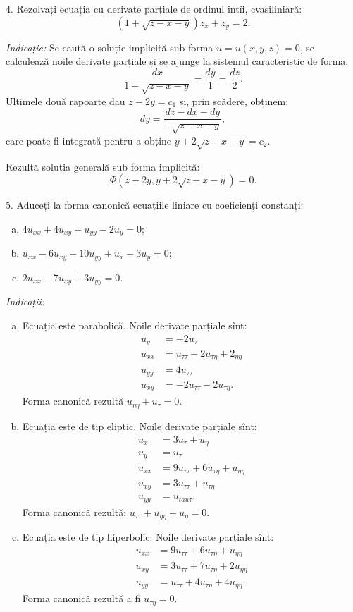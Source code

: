 \vspace{1cm}

4. Rezolvați ecuația cu derivate parțiale de ordinul întîi, cvasiliniară:
\[
  (1 + \sqrt{z - x - y})z_x + z_y = 2.
\]

\emph{Indicație:} Se caută o soluție implicită sub forma $ u = u(x, y, z) = 0 $, se calculează
noile derivate parțiale și se ajunge la sistemul caracteristic de forma:
\[
  \dfrac{dx}{1 + \sqrt{z - x - y}} = \dfrac{dy}{1} = \dfrac{dz}{2}.
\]
Ultimele două rapoarte dau $ z - 2y = c_1 $ și, prin scădere, obținem:
\[
  dy = \dfrac{dz - dx - dy}{-\sqrt{z - x - y}},
\]
care poate fi integrată pentru a obține $ y + 2 \sqrt{z - x - y} = c_2 $.

Rezultă soluția generală sub forma implicită:
\[
  \Phi(z - 2y, y + 2 \sqrt{z - x - y}) = 0.
\]

\vspace{1cm}

5. Aduceți la forma canonică ecuațiile liniare cu coeficienți constanți:
\begin{enumerate}[(a)]
\item $ 4u_{xx} + 4u_{xy} + u_{yy} - 2u_y = 0 $;
\item $ u_{xx} - 6u_{xy} + 10u_{yy} + u_x - 3u_y = 0 $;
\item $ 2u_{xx} - 7u_{xy} + 3u_{yy} = 0 $.
\end{enumerate}

\emph{Indicații:}
\begin{enumerate}[(a)]
\item Ecuația este parabolică. Noile derivate parțiale sînt:
  \begin{align*}
    u_y &= -2u_\tau \\
    u_{xx} &= u_{\tau\tau} + 2u_{\tau\eta} + 2_{\eta\eta} \\
    u_{yy} &= 4u_{\tau\tau} \\
    u_{xy} &= -2u_{\tau\tau} - 2u_{\tau\eta}.
  \end{align*}
  Forma canonică rezultă $ u_{\eta\eta} + u_\tau = 0 $.
\item Ecuația este de tip eliptic. Noile derivate parțiale sînt:
  \begin{align*}
    u_x &= 3u_\tau + u_\eta \\
    u_y &= u_\tau \\
    u_{xx} &= 9u_{\tau\tau} + 6u_{\tau\eta} + u_{\eta\eta} \\
    u_{xy} &= 3u_{\tau\tau} + u_{\tau\eta} \\
    u_{yy} &= u_{tau\tau}.
  \end{align*}
  Forma canonică rezultă: $ u_{\tau\tau} + u_{\eta\eta} + u_\eta = 0 $.
\item Ecuația este de tip hiperbolic. Noile derivate parțiale sînt:
  \begin{align*}
    u_{xx} &= 9u_{\tau\tau} + 6u_{\tau\eta} + u_{\eta\eta} \\
    u_{xy} &= 3u_{\tau\tau} + 7u_{\tau\eta} + 2u_{\eta\eta} \\
    u_{yy} &= u_{\tau\tau} + 4u_{\tau\eta} + 4u_{\eta\eta}.
  \end{align*}
  Forma canonică rezultă a fi $ u_{\tau\eta} = 0 $.
\end{enumerate}

